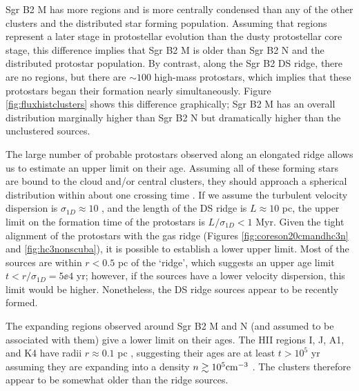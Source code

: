 \documentclass[twocolumn]{aastex61}
\begin{document}
Sgr B2 M has more \hii regions and is more centrally condensed than any of the
other clusters and the distributed star forming population.  Assuming that \hii
regions represent a later stage in protostellar evolution than the dusty
protostellar core stage, this difference implies that Sgr B2 M is older than
Sgr B2 N and the distributed protostar population.  By contrast, along the Sgr
B2 DS ridge, there are no \hii regions, but there are $\sim100$ high-mass
protostars, which implies that these protostars began their formation nearly
simultaneously.  Figure \ref{fig:fluxhistclusters} shows this difference
graphically; Sgr B2 M has an overall distribution marginally higher than Sgr B2
N but dramatically higher than the unclustered sources.

The large number of probable protostars observed along an elongated ridge
allows us to estimate an upper limit on their age.  Assuming all of these
forming stars are bound to the cloud and/or central clusters, they should
approach a spherical distribution within about one crossing time
\citep{Efremov1998a}.  If we assume the turbulent velocity dispersion is
$\sigma_{1D}\approx10$ \kms \citep[e.g.][]{Henshaw2016a}, and the length of the
DS ridge is $L\approx10$ pc, the upper limit on the formation time of the
protostars is $L/\sigma_{1D}<1$ Myr.  Given the tight alignment of the
protostars with the gas ridge (Figures \ref{fig:coreson20cmandhc3n} and
\ref{fig:hc3nonscuba}), it is  possible to establish a lower upper
limit.  Most of the sources are within $r<0.5$ pc of the `ridge', which
suggests an upper age limit $t<r/\sigma_{1D}=5\ee{4}$ yr; however, if
the sources have a lower velocity dispersion, this limit would be higher.
Nonetheless, the DS ridge sources appear to be recently formed.

The expanding \hii regions observed around Sgr B2 M and N (and assumed to be
associated with them) give a lower limit on their ages.  The HII regions I, J,
A1, and K4 have radii $r\approx0.1$ pc \citep{Gaume1995a}, suggesting their
ages are at least $t>10^5$ yr assuming they are expanding into 
a density $n\gtrsim10^5 \textrm{cm}^{-3}$ \citep{de-Pree1995a,Schmiedeke2016a}.
The clusters therefore appear to be somewhat older than the ridge sources.

\end{document}
